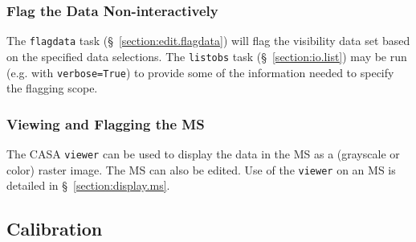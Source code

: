 \subsubsection{Flag the Data Non-interactively}
\label{section:intro.walkthru.flag.flag}

The {\tt flagdata} task (\S~\ref{section:edit.flagdata})
will flag the visibility data set based on the specified data
selections.  The {\tt listobs} task (\S~\ref{section:io.list}) may be
run (e.g. with {\tt verbose=True}) to provide some of the information
needed to specify the flagging scope. 
 
\subsubsection{Viewing and Flagging the MS}
\label{section:intro.walkthru.flag.viewer}

The CASA {\tt viewer} can be used to display the data in the MS
as a (grayscale or color) raster image.  The MS can also be edited.
Use of the {\tt viewer} on an MS is detailed in
\S~\ref{section:display.ms}.

\subsection{Calibration}
\label{section:intro.walkthru.calib}

